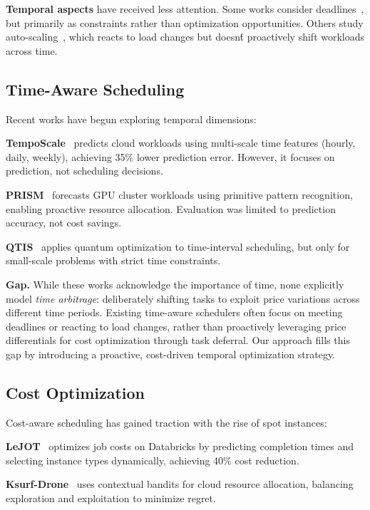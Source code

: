 \documentclass[10pt,conference]{IEEEtran}
\begin{document}
\textbf{Temporal aspects} have received less attention. Some works consider deadlines~\cite{chaudhry2019deadline}, but primarily as constraints rather than optimization opportunities. Others study auto-scaling~\cite{lorido2014review}, which reacts to load changes but doesn\'t proactively shift workloads across time.

\subsection{Time-Aware Scheduling}

Recent works have begun exploring temporal dimensions:

\textbf{TempoScale}~\cite{wen2024temposcale} predicts cloud workloads using multi-scale time features (hourly, daily, weekly), achieving 35\% lower prediction error. However, it focuses on prediction, not scheduling decisions.

\textbf{PRISM}~\cite{wu2026prism} forecasts GPU cluster workloads using primitive pattern recognition, enabling proactive resource allocation. Evaluation was limited to prediction accuracy, not cost savings.

\textbf{QTIS}~\cite{tirado2025qtis} applies quantum optimization to time-interval scheduling, but only for small-scale problems with strict time constraints.

\textbf{Gap.} While these works acknowledge the importance of time, none explicitly model \textit{time arbitrage}: deliberately shifting tasks to exploit price variations across different time periods. Existing time-aware schedulers often focus on meeting deadlines or reacting to load changes, rather than proactively leveraging price differentials for cost optimization through task deferral. Our approach fills this gap by introducing a proactive, cost-driven temporal optimization strategy.

\subsection{Cost Optimization}

Cost-aware scheduling has gained traction with the rise of spot instances:

\textbf{LeJOT}~\cite{ma2025lejot} optimizes job costs on Databricks by predicting completion times and selecting instance types dynamically, achieving 40\% cost reduction.

\textbf{Ksurf-Drone}~\cite{dangana2025ksurf} uses contextual bandits for cloud resource allocation, balancing exploration and exploitation to minimize regret.
\end{document}
